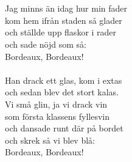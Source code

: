 {\footnotesize{}}\\
\\
Jag minns än idag hur min fader\\
kom hem ifrån staden så glader\\
och ställde upp flaskor i rader\\
och sade nöjd som så:\\
Bordeaux, Bordeaux!\\
\\
Han drack ett glas, kom i extas\\
och sedan blev det stort kalas.\\
Vi små glin, ja vi drack vin\\
som första klassens fyllesvin\\
och dansade runt där på bordet\\
och skrek så vi blev blå:\\
Bordeaux, Bordeaux!
